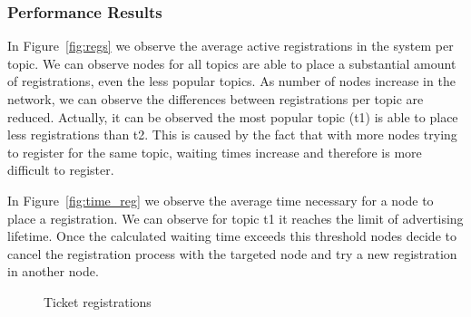 

\subsubsection{Performance Results}



In Figure~\ref{fig:regs} we observe the average active registrations in the system per topic. 
We can observe nodes for all topics are able to place a substantial amount of registrations, even the less popular topics. 
As number of nodes increase in the network, we can observe the differences between registrations per topic are reduced. 
Actually, it can be observed the most popular topic (t1) is able to place less registrations than t2. 
This is caused by the fact that with more nodes trying to register for the same topic, waiting times increase and therefore is more difficult to register.

In Figure~\ref{fig:time_reg} we observe the average time necessary for a node to place a registration.
We can observe for topic t1 it reaches the limit of advertising lifetime. Once the calculated waiting time exceeds this threshold
nodes decide to cancel the registration process with the targeted node and try a new registration in another node.




\begin{figure}[!h]
\centering
{} 
\hspace{-0.25cm}
 \caption{Ticket registrations} 
\label{fig:registrations}
\vspace{-0.15in}
\end{figure}   

